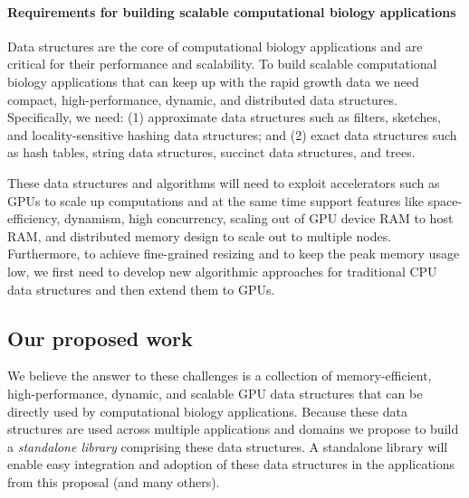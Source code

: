 

\paragraph{Requirements for building scalable computational biology applications}

Data structures are the core of computational biology applications and are critical for their performance and scalability.
To build scalable computational biology applications that can keep up with the rapid growth data we need compact, high-performance, dynamic, and distributed data structures. Specifically, we need: (1) approximate data structures such as filters, sketches, and locality-sensitive hashing data structures; and (2) exact data structures such as hash tables, string data structures, succinct data structures, and trees.

These data structures and algorithms will need to exploit accelerators such as GPUs to scale up computations and at the same time support  features like space-efficiency, dynamism, high concurrency, scaling out of GPU device RAM to host RAM, and distributed memory design to scale out to multiple nodes.
%
Furthermore, to achieve fine-grained resizing and to keep the peak memory usage low, we first need to develop new algorithmic approaches for traditional CPU data structures and then extend them to GPUs.

\subsection{Our proposed work}

We believe the answer to these challenges is a collection of  memory-efficient, high-performance, dynamic, and scalable GPU data structures that can be directly used by computational biology applications. Because these data structures are used across multiple applications and domains we propose to build a \emph{standalone library} comprising these data structures. A standalone library will enable easy integration and adoption of these data structures in the applications from this proposal (and many others).

